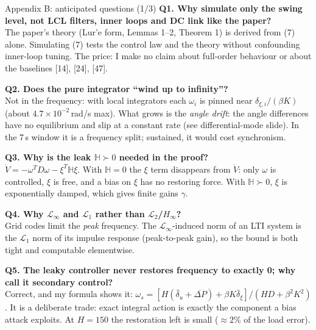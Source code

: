 \documentclass[aspectratio=169,9pt]{beamer}
\newcommand{\bbH}{\mathbb{H}}
\newcommand{\Linf}{\mathcal{L}_\infty}
\newcommand{\Lone}{\mathcal{L}_1}
\begin{document}
\begin{frame}[t]{Appendix B: anticipated questions (1/3)}
\scriptsize
\textbf{Q1. Why simulate only the swing level, not LCL filters, inner loops and DC link like the paper?}\\
The paper's theory (Lur'e form, Lemmas 1--2, Theorem 1) is derived from (7) alone. Simulating (7) tests the control law and the theory without confounding inner-loop tuning. The price: I make no claim about full-order behaviour or about the baselines [14], [24], [47].
\medskip

\textbf{Q2. Does the pure integrator ``wind up to infinity''?}\\
Not in the frequency: with local integrators each $\omega_i$ is pinned near $\delta_{\xi,i}/(\beta K)$ (about $4.7\times10^{-2}$\,rad/s max). What grows is the \emph{angle drift}: the angle differences have no equilibrium and slip at a constant rate (see differential-mode slide). In the 7\,s window it is a frequency split; sustained, it would cost synchronism.
\medskip

\textbf{Q3. Why is the leak $\bbH\succ0$ needed in the proof?}\\
$\dot V=-\omega^TD\omega-\xi^T\bbH\xi$. With $\bbH=0$ the $\xi$ term disappears from $\dot V$: only $\omega$ is controlled, $\xi$ is free, and a bias on $\xi$ has no restoring force. With $\bbH\succ0$, $\xi$ is exponentially damped, which gives finite gains $\gamma$.
\medskip

\textbf{Q4. Why $\Linf$ and $\Lone$ rather than $\mathcal L_2$/$H_\infty$?}\\
Grid codes limit the \emph{peak} frequency. The $\Linf$-induced norm of an LTI system is the $\Lone$ norm of its impulse response (peak-to-peak gain), so the bound is both tight and computable elementwise.
\medskip

\textbf{Q5. The leaky controller never restores frequency to exactly 0; why call it secondary control?}\\
Correct, and my formula shows it: $\omega_s=[H(\bar\delta_u+\overline{\Delta P})+\beta K\bar\delta_\xi]/(HD+\beta^2K^2)$. It is a deliberate trade: exact integral action is exactly the component a bias attack exploits. At $H=150$ the restoration left is small ($\approx2\%$ of the load error).
\end{frame}
\end{document}
